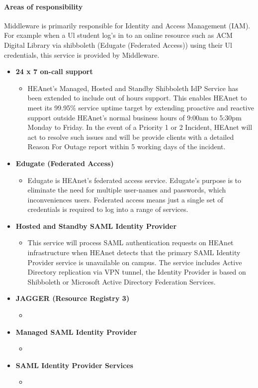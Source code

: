 \documentclass{article}
\begin{document}
	\paragraph{Areas of responsibility \newline}
	Middleware is primarily responsible for Identity and Access Management (IAM). For example when a Ul student log's in to an online resource such as ACM Digital Library via shibboleth (Edugate (Federated Access)) using their Ul credentials, this service is provided by Middleware.
	\begin{itemize}
		\item \textbf{24 x 7  on-call support}
		\begin{itemize}
			\item HEAnet's Managed, Hosted and Standby Shibboleth IdP Service has been extended to include out of hours support. This enables HEAnet to meet its 99.95\% service uptime target by extending proactive and reactive support outside HEAnet's normal business hours of 9:00am to 5:30pm Monday to Friday. In the event of a Priority 1 or 2 Incident, HEAnet will act to resolve such issues and will be provide clients with a detailed Reason For Outage report within 5 working days of the incident. 	
		\end{itemize}
		\item \textbf{Edugate (Federated Access)}
		\begin{itemize}
			\item Edugate is HEAnet's federated access service. Edugate's purpose is to eliminate the need for multiple user-names and passwords, which inconveniences users. Federated access means just a single set of credentials is required to log into a range of services.	
		\end{itemize}
		\item \textbf{Hosted and Standby SAML Identity Provider}
		\begin{itemize}
			\item This service will process SAML authentication requests on HEAnet infrastructure when HEAnet detects that the primary SAML Identity Provider service is unavailable on campus. The service includes Active Directory replication via VPN tunnel, the Identity Provider is based on Shibboleth or Microsoft Active Directory Federation Services.	
		\end{itemize}
		\item \textbf{JAGGER (Resource Registry 3)}
		\begin{itemize}
			\item 	
		\end{itemize}
		\item \textbf{Managed SAML Identity Provider}
		\begin{itemize}
			\item 	
		\end{itemize}
		\item \textbf{SAML Identity Provider Services}
		\begin{itemize}
			\item 	
		\end{itemize}
	\end{itemize}
\end{document}
